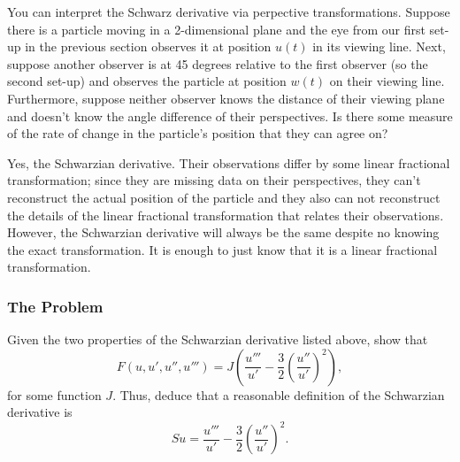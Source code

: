 You can interpret the Schwarz derivative via perpective transformations. Suppose there is a particle moving in a
2-dimensional plane and the eye from our first set-up in the previous section observes it at position \(u(t)\)
in its viewing line. Next, suppose another observer is at 45 degrees relative to the first observer (so the 
second set-up) and observes the particle at position \(w(t)\) on their viewing line. Furthermore, suppose
neither observer knows the distance of their viewing plane and doesn't know the angle difference of
their perspectives. Is there some measure of the rate of change in the particle's position that they can agree on?

Yes, the Schwarzian derivative. Their observations differ by some linear fractional transformation; 
since they are missing data on their perspectives, they can't reconstruct the actual position of the particle
and they also can not reconstruct the details of the linear fractional transformation that relates their observations.
However, the Schwarzian derivative will always be the same despite no knowing the exact transformation. It is
enough to just know that it is a linear fractional transformation. 

\subsubsection*{The Problem}

Given the two properties of the Schwarzian derivative listed above, show that
\begin{equation}
F(u, u', u'', u''') = J\left( \frac{u'''}{u'} - \frac{3}{2} \left(\frac{u''}{u'}\right)^2 \right),
\end{equation}
for some function \(J\). Thus, deduce that a reasonable definition of the Schwarzian derivative is
\begin{equation}
Su = \frac{u'''}{u'} - \frac{3}{2}\left( \frac{u''}{u'} \right)^2.
\end{equation} 
